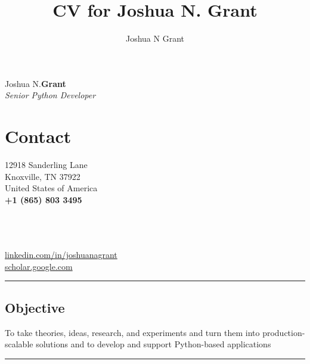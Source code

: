 \documentclass[10pt]{article}%
\author{Joshua N Grant}
\title{CV for Joshua N. Grant}
\begin{document}
\begin{minipage}[ht]{.33\linewidth}%
  \setlength{\headsep}{-10pt}%
  \setlength{\voffset}{-0.75in}%
  {\Large Joshua N.\huge\textbf{Grant}} \\
   \large \textit{Senior Python Developer}
\end{minipage}
\begin{minipage}[ht]{.25\linewidth}%
  \section*{\faUser{} Contact}%
  12918 Sanderling Lane \\
  Knoxville, TN 37922 \\
  United States of America \\
  \textbf{+1 (865) 803 3495} \faMobile \\
\end{minipage}
\begin{minipage}[ht]{.5\linewidth}%
  \href{mailto:jngrant@live.com}{\color{linkcolor}{jngrant@live.com \faEnvelope}} \\
  \href{https://notjustadatum.blogspot.com}{\color{linkcolor}{notjustadatum.blogspot.com \faBold}} \\
  \href{https://github.com/sempervent}{\color{linkcolor}{github.com/sempervent \faGithubAlt}} \\
  \href{https://www.linkedin.com/in/joshua-grant-a3842968}{\color{linkcolor} {\small linkedin.com/in/joshuanagrant} \faLinkedin} \\
  \href{https://scholar.google.com/citations?user=vs-HJQcAAAAJ&hl=en}{\color{linkcolor} {scholar.google.com \faPencil}}
\end{minipage}
\par\noindent\rule{\textwidth}{0.4pt}
\begin{center}
\section*{\faBullseye{} Objective}%
To take theories, ideas, research, and experiments and turn them into production-scalable solutions and to develop and support Python-based applications
\end{center}
\par\noindent\rule{\textwidth}{0.4pt}
\end{document}
